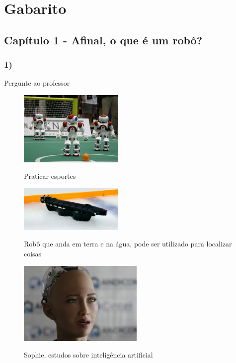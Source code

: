 \chapter*{Gabarito}

\section*{Capítulo 1 - Afinal, o que é um robô?}

    \subsection*{1)}
    Pergunte ao professor
        \begin{multicols}{3}
            \begin{figure}[H]
            \caption{Praticar esportes}
     
            \centering 
            \includegraphics[width=5cm]{Figuras/NAU.jpg}
            \label{figura:NAU.jpeg}
            \end{figure}
        
            \begin{figure}[H]
            \caption{Robô que anda em terra e na água, pode ser utilizado para localizar coisas}
     
            \centering 
            \includegraphics[width=5cm]{Figuras/anfibio.jpg}
            \label{figura:garcom.jpeg}
            \end{figure}

            \begin{figure}[H]
            \caption{Sophie, estudos sobre inteligência artificial}
     
            \centering 
            \includegraphics[width=6cm]{Figuras/sophie.jpeg}
            \label{figura:sophie.jpeg}
            \end{figure}
        \end{multicols}
        
